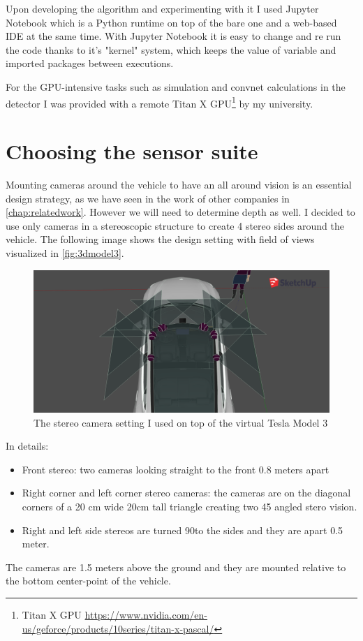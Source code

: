 Upon developing the algorithm and experimenting with it I used Jupyter Notebook
which is a Python runtime on top of the bare one and a web-based IDE at the same
time. With Jupyter Notebook it is easy to change and re run the code thanks
to it's "kernel" system, which keeps the value of variable and imported packages
between executions.

For the GPU-intensive tasks such as simulation and convnet calculations in the
detector I was provided with a remote Titan X GPU\footnote{ Titan X GPU
    \url{https://www.nvidia.com/en-us/geforce/products/10series/titan-x-pascal/}} by
my university.

\section{Choosing the sensor suite}

Mounting cameras around the vehicle to have an all around vision is an essential
design strategy, as we have seen in the work of other companies in
\autoref{chap:relatedwork}. However we will need to determine depth as well. I
decided to use only cameras in a stereoscopic structure to create 4 stereo sides
around the vehicle. The following image shows the design setting with field of
views visualized in \autoref{fig:3dmodel3}.

\begin{figure}[!ht]
    \centering
    \includegraphics[width=150mm, keepaspectratio]{figures/3dmodel3.png}
    \caption{The stereo camera setting I used on top of the virtual Tesla Model 3}
    \label{fig:3dmodel3}
\end{figure}

In details: 
\begin{itemize}
    \item Front stereo: two cameras looking straight to the front 0.8 meters
          apart
    \item Right corner and left corner stereo cameras: the cameras are on the
          diagonal corners of a 20 cm wide 20cm tall triangle creating two 45\degree
          angled stero vision.
    \item Right and left side stereos are turned 90\degree to the sides and they are apart 0.5 meter.
\end{itemize}
The cameras are 1.5 meters above the ground and they are mounted relative to the
bottom center-point of the vehicle.

